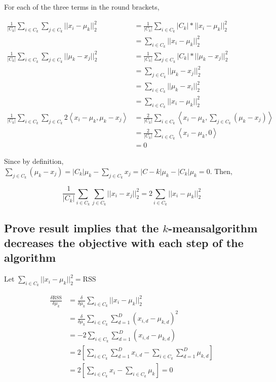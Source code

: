 \documentclass[11pt]{scrartcl}
\newcommand{\km}{$k$-means}
\newcommand{\defrac}[2]{\ensuremath{\frac{\delta #1}{\delta #2}}}
\begin{document}
For each of the three terms in the round brackets,

\begin{align*}
\frac{1}{|C_k|} \sum_{i \in C_k} \sum_{j \in C_k} ||x_i - \mu_k||^2_2 &= \frac{1}{|C_k|} \sum_{i \in C_k} |C_k| * ||x_i - \mu_k||^2_2 \\
&= \sum_{i \in C_k} ||x_i - \mu_k||^2_2 \\
\frac{1}{|C_k|} \sum_{i \in C_k} \sum_{j \in C_k} ||\mu_k - x_j||^2_2 &= \frac{1}{|C_k|} \sum_{j \in C_k} |C_k| * ||\mu_k - x_j||^2_2 \\
&= \sum_{j \in C_k} ||\mu_k - x_j||^2_2 \\
&= \sum_{i \in C_k} ||\mu_k - x_i||^2_2 \\
&= \sum_{i \in C_k} ||x_i - \mu_k||^2_2 \\
\frac{1}{|C_k|} \sum_{i \in C_k} \sum_{j \in C_k} 2\left<x_i - \mu_k, \mu_k - x_j\right> &= \frac{2}{|C_k|}\sum_{i\in C_k} \left<x_i - \mu_k, \sum_{j \in C_k} (\mu_k - x_j) \right> \\
&= \frac{2}{|C_k|}\sum_{i\in C_k} \left<x_i - \mu_k, 0 \right> \\
&= 0
\end{align*}

Since by definition, $\sum_{j \in C_k} (\mu_k - x_j) = |C_k|\mu_k - \sum_{j \in C_k} x_j = |C-k|\mu_k - |C_k|\mu_k = 0$. Then,

\[\frac{1}{|C_k|} \sum_{i \in C_k} \sum_{j \in C_k} ||x_i - x_j||^2_2 = 2 \sum_{i \in C_k} ||x_i - \mu_k||^2_2\]

\subsection{Prove result implies that the \km algorithm decreases the objective with each step of the algorithm}

Let $\sum_{i \in C_k} ||x_i - \mu_k||^2_2 = \mathrm{RSS}$

\begin{align*}
\defrac{\mathrm{RSS}}{\mu_k} &= \defrac{}{\mu_k} \sum_{i \in C_k} ||x_i - \mu_k||^2_2 \\
&= \defrac{}{\mu_k} \sum_{i \in C_k} \sum_{d=1}^D (x_{i,d} - \mu_{k,d})^2 \\
&= - 2 \sum_{i \in C_k} \sum_{d=1}^D (x_{i,d} - \mu_{k,d}) \\
&= 2 \left[ \sum_{i \in C_k} \sum_{d=1}^D x_{i,d} - \sum_{i \in C_k} \sum_{d=1}^D \mu_{k,d} \right] \\
&= 2 \left[ \sum_{i \in C_k} x_i - \sum_{i \in C_k} \mu_k \right] = 0
\end{align*}
\end{document}
